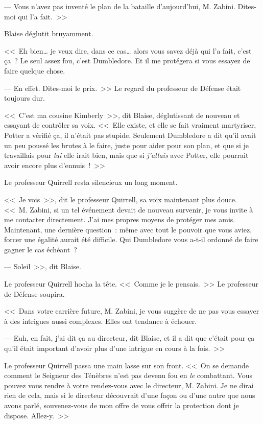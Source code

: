 --- Vous n'avez pas inventé le plan de la bataille d'aujourd'hui, M. Zabini. Dites-moi qui l'a fait.~>>

Blaise déglutit bruyamment.

<<~Eh bien… je veux dire, dans ce cas… alors vous savez déjà qui l'a fait, c'est ça~? Le seul assez fou, c'est Dumbledore. Et il me protégera si vous essayez de faire quelque chose.

--- En effet. Dites-moi le prix.~>> Le regard du professeur de Défense était toujours dur.

<<~C'est ma cousine Kimberly~>>, dit Blaise, déglutissant de nouveau et essayant de contrôler sa voix. <<~Elle existe, et elle se fait vraiment martyriser, Potter a vérifié ça, il n'était pas stupide. Seulement Dumbledore a dit qu'il avait un peu poussé les brutes à le faire, juste pour aider pour son plan, et que si je travaillais pour \emph{lui} elle irait bien, mais que si \emph{j'allais} avec Potter, elle pourrait avoir encore plus d'ennuis~!~>>

Le professeur Quirrell resta silencieux un long moment.

<<~Je vois~>>, dit le professeur Quirrell, sa voix maintenant plus douce. <<~M. Zabini, si un tel événement devait de nouveau survenir, je vous invite à me contacter directement. J'ai mes propres moyens de protéger mes amis. Maintenant, une dernière question~: même avec tout le pouvoir que vous aviez, forcer une égalité aurait été difficile. Qui Dumbledore vous a-t-il ordonné de faire gagner le cas échéant~?

--- Soleil~>>, dit Blaise.

Le professeur Quirrell hocha la tête. <<~Comme je le pensais.~>> Le professeur de Défense soupira.

<<~Dans votre carrière future, M. Zabini, je vous suggère de ne pas vous essayer à des intrigues aussi complexes. Elles ont tendance à échouer.

--- Euh, en fait, j'ai dit ça au directeur, dit Blaise, et il a dit que c'était pour ça qu'il était important d'avoir plus d'une intrigue en cours à la fois.~>>

Le professeur Quirrell passa une main lasse sur son front. <<~On se demande comment le Seigneur des Ténèbres n'est pas devenu fou en \emph{le} combattant. Vous pouvez vous rendre à votre rendez-vous avec le directeur, M. Zabini. Je ne dirai rien de cela, mais si le directeur découvrait d'une façon ou d'une autre que nous avons parlé, souvenez-vous de mon offre de vous offrir la protection dont je dispose. Allez-y.~>>

